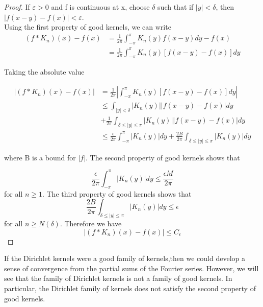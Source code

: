 \documentclass{article}
\begin{document}
\begin{proof}
    If $ \varepsilon >0 $ and f is continuous at x, choose $ \delta  $  such that if $|y| < \delta $, then $|f(x − y) − f(x)| < \varepsilon $.\\
    Using the first property of good kernels, we can write
    \begin{align*}
        (f*K_n)(x)-f(x)&=\frac{1}{2\pi}\int_{-\pi}^{\pi}K_n(y)f(x-y)dy-f(x)\\
        &=\frac{1}{2\pi}\int_{-\pi}^{\pi}K_n(y)[f(x-y)-f(x)]dy
    \end{align*}

    Taking the absolute value

    \begin{align*}
        \left\lvert(f*K_n)(x)-f(x)\right\rvert&=\frac{1}{2\pi}\left\lvert \int_{-\pi}^{\pi}K_n(y)[f(x-y)-f(x)]dy \right\rvert\\
        &\leqslant \int_{|y|<\delta}\left\lvert K_n(y) \right\rvert |f(x-y)-f(x)|dy\\
        &+\frac{1}{2\pi}\int_{\delta \leqslant |y|\leqslant \pi}\left\lvert K_n(y) \right\rvert |f(x-y)-f(x)|dy\\
        &\leqslant \frac{\epsilon }{2\pi}\int_{-\pi}^{\pi}\left\lvert K_n(y) \right\rvert dy+\frac{2B}{2\pi}\int_{\delta \leqslant |y|\leqslant \pi}\left\lvert K_n(y) \right\rvert dy
    \end{align*}

    where B is a bound for $ |f| $. The second property of good kernels shows that

    \[ \frac{\epsilon }{2\pi}\int_{-\pi}^{\pi}\left\lvert K_n(y) \right\rvert dy \leqslant \frac{\epsilon M}{2\pi}\]
    for all $ n \geqslant 1 $. The third property of good kernels shows that
    \[ \frac{2B}{2\pi}\int_{\delta \leqslant |y|\leqslant \pi}\left\lvert K_n(y) \right\rvert dy \leqslant \epsilon  \]
    for all $ n \geqslant N(\delta ) $. Therefore we have
    \[ | (f*K_n)(x)-f(x)| \leqslant C_{\epsilon }\]





    
\end{proof}

If the Dirichlet kernels were a good family of kernels,then we could develop a sense of convergence from the partial sums of the Fourier series. However, we will see that the family of Dirichlet kernels is not a family of good kernels. In particular, the Dirichlet family of kernels does not satisfy the second property of good kernels.
\end{document}
